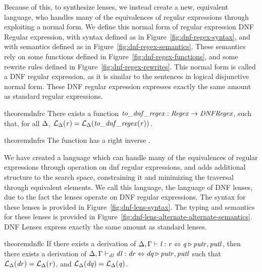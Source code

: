 



Because of this, to synthesize lenses, we instead create a new, equivalent language,
who handles many of the equivalences of regular expressions through exploiting a normal form.
We define this normal form of regular expression DNF Regular expression, with syntax
defined as in Figure~\ref{fig:dnf-regex-syntax}, and with semantics defined as
in Figure~\ref{fig:dnf-regex-semantics}.  These semantics rely on some functions
defined in Figure~\ref{fig:dnf-regex-functions},
and some rewrite rules defined in Figure~\ref{fig:dnf-regex-rewrites}.
This normal form is called a DNF regular expression, as it is similar to the
sentences in logical disjunctive normal form.
These DNF regular expression expresses exactly the same amount as standard regular
expressions.
\begin{restatable}{theorem}{dnfrc}
\label{thm:completeness-dnf-lenses}
There exists a function $\mathit{to\_dnf\_regex}:\mathit{Regex} \rightarrow \mathit{DNF Regex}$,
such that, for all $\Delta$, $\mathcal{L}_{\Delta}(\mathit{r})=\mathcal{L}_{\Delta}(\mathit{to\_dnf\_regex}(\mathit{r}))$.
\end{restatable}

\begin{restatable}{theorem}{dnfrs}
\label{thm:soundness-dnf-lenses}
The function \ToDNFRegex{} has a right inverse \FromDNFRegex{}.
\end{restatable}




We have created a language which can handle many of the equivalences of regular
expressions through operation on dnf regular expressions,
and adds additional structure to the search
space, constraining it and minimizing the traversal through equivalent elements.
We call this language, the language of DNF lenses, due to the fact the lenses
operate on DNF regular expressions.
The syntax for these lenses is provided in Figure~\ref{fig:dnf-lens-syntax}.
The typing and semantics for these lenses is provided in Figure~\ref{fig:dnf-lens-alternate-alternate-semantics}.
DNF Lenses express exactly the same amount as standard lenses.
\begin{restatable}{theorem}{dnflc}
\label{thm:completeness-dnf-lenses}
If there exists a derivation of $\Delta, \Gamma \vdash \mathit{l} : \mathit{r} \Leftrightarrow \mathit{q} \triangleright \mathit{putr},\mathit{putl}$,
then there exists a derivation of $\Delta, \Gamma \vdash_{\mathit{dl}} \mathit{dl} : \mathit{dr} \Leftrightarrow \mathit{dq} \triangleright \mathit{putr},\mathit{putl}$ such that
$\mathcal{L}_{\Delta}(\mathit{dr})=\mathcal{L}_{\Delta}(\mathit{r})$, and
$\mathcal{L}_{\Delta}(\mathit{dq})=\mathcal{L}_{\Delta}(\mathit{q})$.
\end{restatable}

